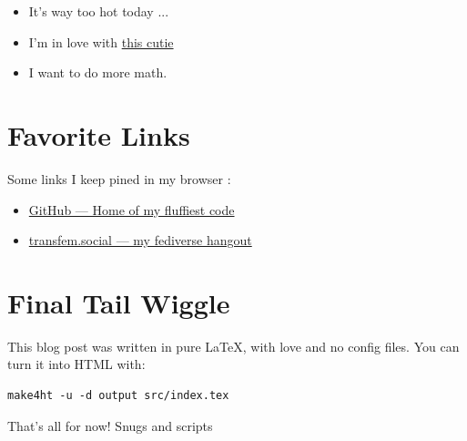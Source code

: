 \documentclass{article}
\begin{document}
\begin{itemize}
  \item It's way too hot today ...
  \item I'm in love with \href{https://github.com/Sigmanificient}{this cutie}
  \item I want to do more math.
\end{itemize}

\section*{Favorite Links}

Some links I keep pined in my browser :

\begin{itemize}
  \item \href{https://github.com/Jaggernaute}{GitHub — Home of my fluffiest code}
  \item \href{https://transfem.social/@jaggi}{transfem.social — my fediverse hangout}
\end{itemize}

\section*{Final Tail Wiggle}

This blog post was written in pure LaTeX, with love and no config files. You can turn it into HTML with:

\begin{verbatim}
make4ht -u -d output src/index.tex
\end{verbatim}

That’s all for now! Snugs and scripts
\end{document}
